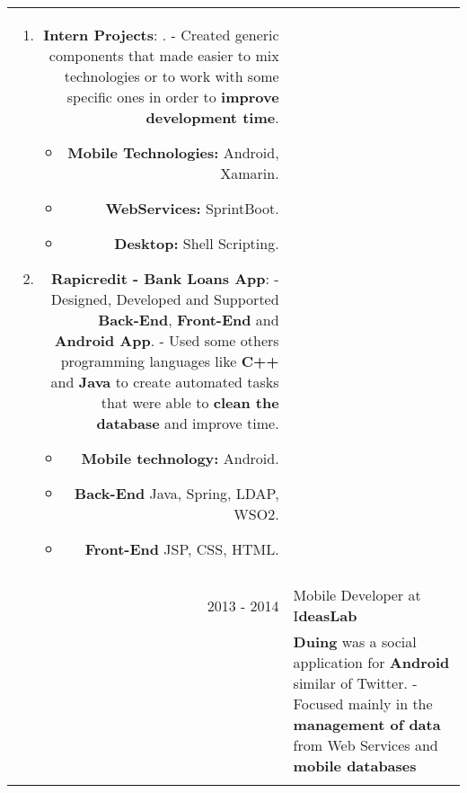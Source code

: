\documentclass[a4paper,11pt]{article} %
\begin{document}
\begin{tabular}{r|p{12cm}}
{\begin{enumerate}
\item \textbf{Intern Projects}: .\newline
- Created generic components that made easier to mix technologies or to work with some specific ones in order to \textbf{improve development time}.
\begin{itemize}
\item \textbf{Mobile Technologies:} Android, Xamarin.
\item \textbf{WebServices:} SprintBoot.
\item \textbf{Desktop:} Shell Scripting.
\end{itemize}
\item \textbf{Rapicredit  - Bank Loans App}: \newline
- Designed, Developed and Supported \textbf{Back-End}, \textbf{Front-End} and \textbf{Android App}.  \newline
- Used some others programming languages like \textbf{C++} and \textbf{Java} to create automated tasks that were able to \textbf{clean the database} and improve time.
\begin{itemize}
\item \textbf{Mobile technology:} Android.
\item \textbf{Back-End} Java, Spring, LDAP, WSO2.
\item \textbf{Front-End} JSP, CSS, HTML.
\end{itemize}
\end{enumerate}} \\
\multicolumn{2}{c}{} \\
\textsc{2013 - 2014} & Mobile Developer at I\textbf{deasLab}\\
& \footnotesize{\textbf{Duing} was a social application for \textbf{Android} similar of Twitter. \newline
- Focused mainly in the \textbf{management of data} from Web Services and \textbf{mobile databases}}\\
\multicolumn{2}{c}{} \\
\end{tabular}


\end{document}
